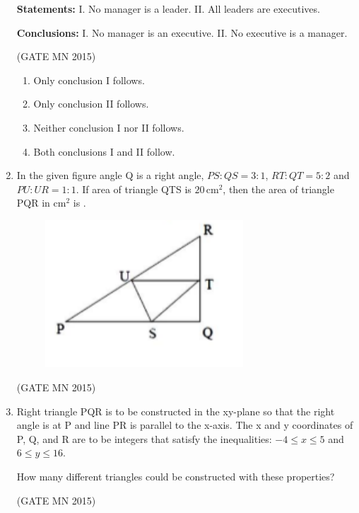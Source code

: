 \documentclass[journal]{IEEEtran}
\begin{document}
\begin{enumerate}
\textbf{Statements:}  
I. No manager is a leader.  
II. All leaders are executives.  

\textbf{Conclusions:}  
I. No manager is an executive.  
II. No executive is a manager.  

\hfill(GATE MN 2015)

\begin{enumerate}
\item Only conclusion I follows.  
\item Only conclusion II follows.  
\item Neither conclusion I nor II follows.  
\item Both conclusions I and II follow.  
\end{enumerate}

\item In the given figure angle Q is a right angle, $PS:QS = 3:1$, $RT:QT = 5:2$ and $PU:UR = 1:1$.  
If area of triangle QTS is $20 \,\text{cm}^2$, then the area of triangle PQR in cm$^2$ is \underline{\hspace{2cm}}. 
\begin{figure}[H]
    \centering
        \includegraphics[width=0.7\textwidth]{Screenshot_2025_0816_191824.png}
	    \caption{}
    \label{fig:Q8}
    \end{figure}

    \hfill(GATE MN 2015)

\item Right triangle PQR is to be constructed in the xy-plane so that the right angle is at P and line PR is parallel to the x-axis. The x and y coordinates of P, Q, and R are to be integers that satisfy the inequalities:  
$-4 \leq x \leq 5$ and $6 \leq y \leq 16$.  

How many different triangles could be constructed with these properties?  

\hfill(GATE MN 2015)


\end{enumerate}
\end{document}
